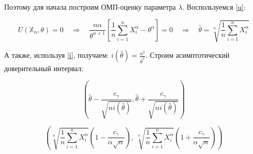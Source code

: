\documentclass[12pt]{article}
\begin{document}
Поэтому для начала построим ОМП-оценку параметра $\lambda$. Воспользуемся \eqref{u}:

$$
U(\mathbb{X}_n, \theta) = 0 \quad\Rightarrow\quad
\frac{n\alpha}{\theta^{\alpha+1}}\left[\frac{1}{n}\sum_{i=1}^n X_i^\alpha - \theta^\alpha \right] = 0 \quad\Rightarrow\quad
\boxed{\hat{\theta} = \sqrt[\alpha]{\frac{1}{n}\sum_{i=1}^n X_i^\alpha}}
$$

А также, используя \eqref{i}, получаем: $ i(\hat\theta) = \frac{\alpha^2}{\hat{\theta}^2} $. Строим асимптотический доверительный интервал:

$$
\left(
	\hat\theta - \frac{c_\gamma}{\sqrt{n i(\hat\theta)}}, 
	\hat\theta + \frac{c_\gamma}{\sqrt{n i(\hat\theta)}}
\right)
$$

$$
\left(
	\sqrt[\alpha]{\frac{1}{n}\sum_{i=1}^n X_i^\alpha}\left(1 - \frac{c_\gamma }{\alpha\sqrt{n}}\right),\
	\sqrt[\alpha]{\frac{1}{n}\sum_{i=1}^n X_i^\alpha}\left(1 + \frac{c_\gamma }{\alpha\sqrt{n}}\right)
\right)
$$
\end{document}
